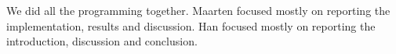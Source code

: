 We did all the programming together.
Maarten focused mostly on reporting the implementation, results and discussion.
Han focused mostly on reporting the introduction, discussion and conclusion.
